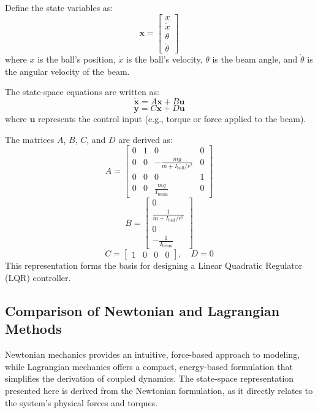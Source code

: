 \documentclass[conference]{IEEEtran}
\begin{document}
Define the state variables as:
\[
\mathbf{x} = 
\begin{bmatrix}
x \\ \dot{x} \\ \theta \\ \dot{\theta}
\end{bmatrix}
\]
where \(x\) is the ball's position, \(\dot{x}\) is the ball's velocity, \(\theta\) is the beam angle, and \(\dot{\theta}\) is the angular velocity of the beam.

The state-space equations are written as:
\begin{equation}
\dot{\mathbf{x}} = A\mathbf{x} + B\mathbf{u}
\end{equation}
\begin{equation}
\mathbf{y} = C\mathbf{x} + D\mathbf{u}
\end{equation}
where \(\mathbf{u}\) represents the control input (e.g., torque or force applied to the beam).

The matrices \(A\), \(B\), \(C\), and \(D\) are derived as:
\[
A = 
\begin{bmatrix}
0 & 1 & 0 & 0 \\
0 & 0 & -\frac{mg}{m+I_{\text{ball}}/r^2} & 0 \\
0 & 0 & 0 & 1 \\
0 & 0 & \frac{mg}{I_{\text{beam}}} & 0
\end{bmatrix}
\]
\[
B = 
\begin{bmatrix}
0 \\ 
\frac{1}{m+I_{\text{ball}}/r^2} \\ 
0 \\ 
-\frac{1}{I_{\text{beam}}}
\end{bmatrix}
\]
\[
C = 
\begin{bmatrix}
1 & 0 & 0 & 0
\end{bmatrix}, \quad
D = 0
\]
This representation forms the basis for designing a Linear Quadratic Regulator (LQR) controller.

\subsection{Comparison of Newtonian and Lagrangian Methods}
Newtonian mechanics provides an intuitive, force-based approach to modeling, while Lagrangian mechanics offers a compact, energy-based formulation that simplifies the derivation of coupled dynamics. The state-space representation presented here is derived from the Newtonian formulation, as it directly relates to the system's physical forces and torques.
\end{document}
